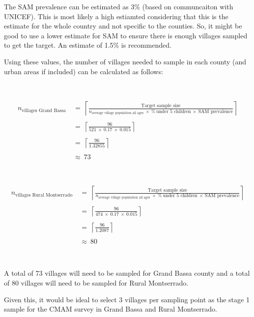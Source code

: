\documentclass[12pt,a4paper]{book}
\theoremstyle{definition}
\theoremstyle{definition}
\theoremstyle{definition}
\theoremstyle{remark}
\begin{document}
The SAM prevalence can be estimated as 3\% (based on communcaiton with
UNICEF). This is most likely a high estiamted considering that this is
the estimate for the whole country and not specific to the counties. So,
it might be good to use a lower estimate for SAM to ensure there is
enough villages sampled to get the target. An estimate of 1.5\% is
recommended.

Using these values, the number of villages needed to sample in each
county (and urban areas if included) can be calculated as follows:

~

\[\begin{aligned} 
n_{\text{villages Grand Bassa}} & ~ = ~ \left \lceil \frac{\text{Target sample size}}{n_{\text{average village population all ages}} ~ \times ~ \% ~ \text{under 5 children} ~ \times ~ \text{SAM prevalence}} \right \rceil \\
\\
& ~ = ~ \left \lceil \frac{96}{521 ~ \times ~ 0.17 ~ \times ~ 0.015} \right \rceil \\
\\
& ~ = ~ \left \lceil \frac{96}{1.32855} \right \rceil \\
\\
& ~ \approx ~ 73
\end{aligned}\]

~

\[\begin{aligned} 
n_{\text{villages Rural Montserrado}} & ~ = ~ \left \lceil \frac{\text{Target sample size}}{n_{\text{average village population all ages}} ~ \times ~ \% ~ \text{under 5 children} ~ \times ~ \text{SAM prevalence}} \right \rceil \\
\\
& ~ = ~ \left \lceil \frac{96}{474 ~ \times ~ 0.17 ~ \times ~ 0.015} \right \rceil \\
\\
& ~ = ~ \left \lceil \frac{96}{1.2087} \right \rceil \\
\\
& ~ \approx ~ 80
\end{aligned}\]

~

A total of 73 villages will need to be sampled for Grand Bassa county
and a total of 80 villages will need to be sampled for Rural
Montserrado.

Given this, it would be ideal to select 3 villages per sampling point as
the stage 1 sample for the CMAM survey in Grand Bassa and Rural
Montserrado.
\end{document}

